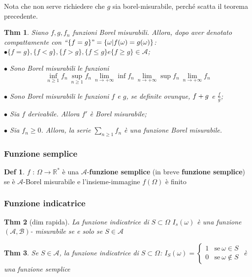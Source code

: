 \documentclass[a4paper,11pt]{article}
\theoremstyle{plain}
\newtheorem{thm}{Thm}[section]
\theoremstyle{definition}
\newtheorem{defn}{Def}[section]
\theoremstyle{remark}
\begin{document}
Nota che non serve richiedere che $g$ sia borel-misurabile, perché scatta il teorema precedente.


\begin{thm} Siano $f, g, f_{n}$ funzioni Borel misurabili. Allora, dopo aver denotato compattamente con “$\{f=g\}"=\{\omega| f(\omega)=g(\omega)\}$:\\

$\bullet\{f=g\}, \{f<g\}, \{f>g\}, \{f\leq g\} e \{f\geq g\}\in \mathcal{A}$;

$\bullet$ Sono Borel misurabili le funzioni
$$
\inf_{n\geq 1}f_{n}\ \sup_{n\geq 1}f_{n}\ \lim_{n\rightarrow +\infty }\inf_{} f_{n}\ \lim_{n\rightarrow +\infty }\sup_{} f_{n}\ \lim_{n\rightarrow+\infty}f_{n}
$$

$\bullet$ Sono Borel misurabili le funzioni $f$ e $g$, se definite ovunque, $f+g\displaystyle$ e $\frac{f}{g}$; 

$\bullet$ Sia $f$ derivabile. Allora $f'$ è Borel misurabile;

$\bullet$ Sia $f_{n}\geq 0$. Allora, la serie $\displaystyle \sum_{n\geq 1}f_{n}$ è una funzione Borel misurabile.
\end{thm}

\subsubsection{Funzione semplice}
\begin{defn}
$f$ : $\Omega\rightarrow \mathbb{R}^{*}$ è una $\mathbf{\mathcal{A}}$-\textbf{funzione semplice} (in breve \textbf{funzione semplice}) se è $\mathcal{A}$-Borel misurabile $\mathrm{e}$ l'insieme-immagine $f(\Omega)$ è finito
\end{defn}

\subsubsection{Funzione indicatrice}
\begin{thm}[dim rapida] La funzione indicatrice di $S \subset \Omega$ $I_{s}(\omega)$ è una funzione $(\mathcal{A}, \mathcal{B})$- misurabile se e solo se $S\in \mathcal{A}$
\end{thm}

\begin{thm} Se $S\in \mathcal{A}$, la {funzione indicatrice} di $ S\subset\Omega$:
$I_{S}(\omega)=\left\{\begin{array}{ll}
1 & \mathrm{s}\mathrm{e}\ \omega\in S\\
0 & \mathrm{s}\mathrm{e}\ \omega\not\in S
\end{array}\right.$
è una funzione semplice 
\end{thm}
\end{document}
